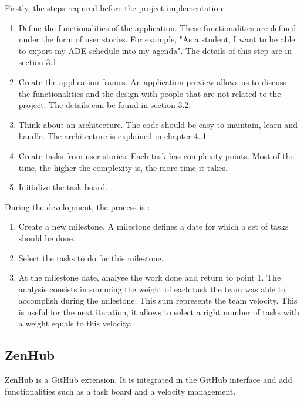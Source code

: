 \documentclass{eplmastersthesis}
\begin{document}
Firstly, the steps required before the project implementation:
\begin{enumerate}
\item Define the functionalities of the application. These functionalities are defined under the form of user stories. For example, "As a student, I want to be able to export my ADE schedule into my agenda". The details of this step are in section 3.1.
\item Create the application frames. An application preview allows us to discuss the functionalities and the design with people that are not related to the project. The details can be found in section 3.2.
\item Think about an architecture. The code should be easy to maintain, learn and handle. The architecture is explained in chapter 4..1
\item Create tasks from user stories. Each task has complexity points. Most of the time, the higher the complexity is, the more time it takes.
\item Initialize the task board.\\
\end{enumerate}

During the development, the process is :

\begin{enumerate}
\item Create a new milestone. A milestone defines a date for which a set of tasks should be done.
\item Select the tasks to do for this milestone. 
\item At the milestone date, analyse the work done and return to point 1. The analysis consists in summing the weight of each task the team was able to accomplish during the milestone. This sum represents the team velocity. This is useful for the next iteration, it allows to select a right number of tasks with a weight equals to this velocity.
\end{enumerate}

\subsection{ZenHub}
ZenHub is a GitHub extension. It is integrated in the GitHub interface and add functionalities such as a task board and a velocity management.  
\end{document}

